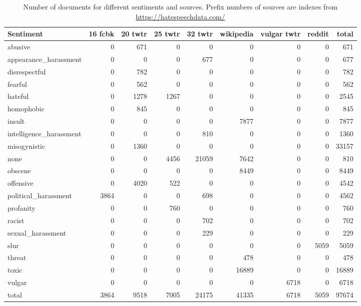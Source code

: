 \documentclass[fleqn,moreauthors,10pt]{ds_report}
\begin{document}
\begin{table*}[ht]
\centering
\begin{tabular}{l|rrrrrrr|r}
Sentiment & 16 fcbk & 20 twtr & 25 twtr & 32 twtr & wikipedia & vulgar twtr & reddit & total \\
\midrule
  abusive &   0 & 671 &   0 &   0 &   0 &   0 &   0                   & 671   \\ 
  appearance\_harassment &   0 &   0 &   0 & 677 &   0 &   0 &   0    & 677   \\ 
  disrespectful &   0 & 782 &   0 &   0 &   0 &   0 &   0             & 782   \\ 
  fearful &   0 & 562 &   0 &   0 &   0 &   0 &   0                   & 562   \\ 
  hateful &   0 & 1278 & 1267 &   0 &   0 &   0 &   0                 & 2545  \\ 
  homophobic &   0 & 845 &   0 &   0 &   0 &   0 &   0                & 845   \\ 
  insult &   0 &   0 &   0 &   0 & 7877 &   0 &   0                   & 7877  \\ 
  intelligence\_harassment &   0 &   0 &   0 & 810 &   0 &   0 &   0  & 1360  \\ 
  misogynistic &   0 & 1360 &   0 &   0 &   0 &   0 &   0             & 33157 \\ 
  none &   0 &   0 & 4456 & 21059 & 7642 &   0 &   0                  & 810   \\ 
  obscene &   0 &   0 &   0 &   0 & 8449 &   0 &   0                  & 8449  \\ 
  offensive &   0 & 4020 & 522 &   0 &   0 &   0 &   0                & 4542  \\ 
  political\_harassment & 3864 &   0 &   0 & 698 &   0 &   0 &   0    & 4562  \\ 
  profanity &   0 &   0 & 760 &   0 &   0 &   0 &   0                 & 760   \\ 
  racist &   0 &   0 &   0 & 702 &   0 &   0 &   0                    & 702   \\ 
  sexual\_harassment &   0 &   0 &   0 & 229 &   0 &   0 &   0        & 229   \\ 
  slur &   0 &   0 &   0 &   0 &   0 &   0 & 5059                     & 5059  \\ 
  threat &   0 &   0 &   0 &   0 & 478 &   0 &   0                    & 478   \\ 
  toxic &   0 &   0 &   0 &   0 & 16889 &   0 &   0                   & 16889 \\ 
  vulgar &   0 &   0 &   0 &   0 &   0 & 6718 &   0                   & 6718  \\ 
  \bottomrule
  total & 3864 & 9518 & 7005 & 24175 & 41335 & 6718 & 5059            & 97674 \\
\end{tabular}
\caption{Number of documents for different sentiments and sources. Prefix numbers of sources are indexes from \url{https://hatespeechdata.com/}}
\label{tab:sentiment-source}
\end{table*}
\end{document}
